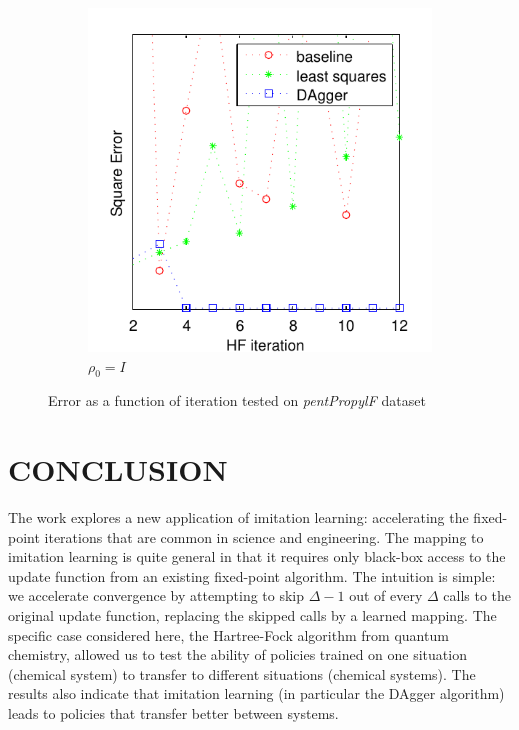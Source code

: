 \documentclass[twoside,11pt]{article}
\begin{document}
\begin{figure}[h!]
\begin{subfigure}{.5\textwidth}
  \includegraphics[scale=0.7]{propylsub_peye_test_12iter.pdf}
  \caption{$\rho_0 = I$}
  \label{fig:propSubI}
\end{subfigure}
\caption{Error as a function of iteration tested on \textit{pentPropylF} dataset}
\label{fig:testpropSub}
\end{figure}


\section{CONCLUSION}

The work explores a new application of imitation learning: accelerating the fixed-point iterations that are common in science and engineering. The mapping to imitation learning is quite general in that it requires only black-box access to the update function from an existing fixed-point algorithm.  The intuition is simple: we accelerate convergence by attempting to skip $\Delta-1$ out of every $\Delta$ calls to the original update function, replacing the skipped calls by a learned mapping.
The specific case considered here, the Hartree-Fock algorithm from quantum chemistry, allowed us to test the ability of policies trained on one situation (chemical system) to transfer to different situations (chemical systems). The results also indicate that imitation learning (in particular the DAgger algorithm) leads to policies that transfer better between systems.  
\end{document}
